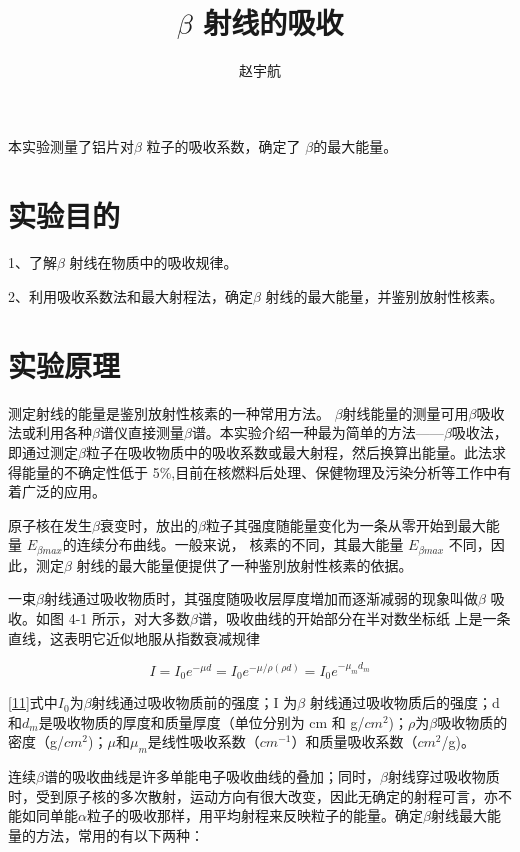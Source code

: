 \documentclass[hyperref]{ctexart}
\title{\textbf{$\beta$ 射线的吸收}}
\author{\sffamily 赵宇航}
\date{}
\begin{document}
\maketitle
{}本实验测量了铝片对$\beta$ 粒子的吸收系数，确定了 $\beta $的最大能量。 \\	
	\section{实验目的}
	1、了解$\beta$ 射线在物质中的吸收规律。

	2、利用吸收系数法和最大射程法，确定$\beta$ 射线的最大能量，并鉴别放射性核素。
	\section{实验原理}
	测定射线的能量是鉴別放射性核素的一种常用方法。 $\beta$射线能量的测量可用$\beta$吸收法或利用各种$\beta$谱仪直接测量$\beta$谱。本实验介绍一种最为简单的方法——$\beta$吸收法，即通过测定$\beta$粒子在吸收物质中的吸收系数或最大射程，然后换算出能量。此法求得能量的不确定性低于 5\%,目前在核燃料后处理、保健物理及污染分析等工作中有着广泛的应用。

	原子核在发生$\beta$衰变时，放出的$\beta$粒子其强度随能量变化为一条从零开始到最大能量 $E_{\beta {max}}$的连续分布曲线。一般来说，
核素的不同，其最大能量 $E_{\beta {max}}$ 不同，因此，测定$\beta$ 射线的最大能量便提供了一种鉴別放射性核素的依据。

	一束$\beta$射线通过吸收物质时，其强度随吸收层厚度増加而逐渐减弱的现象叫做$\beta$ 吸收。如图 4-1 所示，对大多数$\beta$谱，吸收曲线的开始部分在半对数坐标纸
上是一条直线，这表明它近似地服从指数衰减规律

	\begin{equation}
	I=I_0e^{-\mu d}=I_0e^{-\mu/\rho(\rho d)}=I_0e^{-\mu_md_m}\label{11}
	\end{equation}

	\eqref{11}式中$I_0$为$\beta$射线通过吸收物质前的强度；I 为$\beta$ 射线通过吸收物质后的强度；d 和$d_m$是吸收物质的厚度和质量厚度（单位分别为 cm 和 g/${cm}^2$)；$\rho$为$\beta$吸收物质的密度（g/${cm}^2$)；$ \mu$和$\mu_m$是线性吸收系数（${cm}^{-1}$）和质量吸收系数（${cm}^2$/g)。

	连续$\beta$谱的吸收曲线是许多单能电子吸收曲线的叠加；同时，$\beta$射线穿过吸收物质时，受到原子核的多次散射，运动方向有很大改变，因此无确定的射程可言，亦不能如同单能$\alpha$粒子的吸收那样，用平均射程来反映粒子的能量。确定$\beta$射线最大能量的方法，常用的有以下两种：
\end{document}
